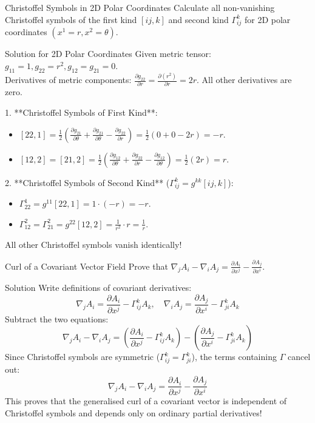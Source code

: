 \documentclass[11pt,a4paper]{article}
\begin{document}
\begin{examplebox}{Christoffel Symbols in 2D Polar Coordinates}
Calculate all non-vanishing Christoffel symbols of the first kind $[ij, k]$ and second kind $\Gamma^k_{ij}$ for 2D polar coordinates $(x^1=r, x^2=\theta)$.
\end{examplebox}
\begin{proofbox}{Solution for 2D Polar Coordinates}
Given metric tensor: $g_{11} = 1, g_{22} = r^2, g_{12} = g_{21} = 0$. \\
Derivatives of metric components: $\frac{\partial g_{22}}{\partial r} = \frac{\partial(r^2)}{\partial r} = 2r$. All other derivatives are zero.

1. **Christoffel Symbols of First Kind**:
\begin{itemize}
    \item $[22, 1] = \frac{1}{2} \left( \frac{\partial g_{21}}{\partial \theta} + \frac{\partial g_{21}}{\partial \theta} - \frac{\partial g_{22}}{\partial r} \right) = \frac{1}{2} (0 + 0 - 2r) = -r$.
    \item $[12, 2] = [21, 2] = \frac{1}{2} \left( \frac{\partial g_{12}}{\partial \theta} + \frac{\partial g_{22}}{\partial r} - \frac{\partial g_{12}}{\partial \theta} \right) = \frac{1}{2} (2r) = r$.
\end{itemize}

2. **Christoffel Symbols of Second Kind** ($\Gamma^k_{ij} = g^{kk} [ij, k]$):
\begin{itemize}
    \item $\Gamma^1_{22} = g^{11} [22, 1] = 1 \cdot (-r) = -r$.
    \item $\Gamma^2_{12} = \Gamma^2_{21} = g^{22} [12, 2] = \frac{1}{r^2} \cdot r = \frac{1}{r}$.
\end{itemize}
All other Christoffel symbols vanish identically!
\end{proofbox}

\begin{examplebox}{Curl of a Covariant Vector Field}
Prove that $\nabla_j A_i - \nabla_i A_j = \frac{\partial A_i}{\partial x^j} - \frac{\partial A_j}{\partial x^i}$.
\end{examplebox}
\begin{proofbox}{Solution}
Write definitions of covariant derivatives:
\[
\nabla_j A_i = \frac{\partial A_i}{\partial x^j} - \Gamma^k_{ij} A_k, \quad \nabla_i A_j = \frac{\partial A_j}{\partial x^i} - \Gamma^k_{ji} A_k
\]
Subtract the two equations:
\[
\nabla_j A_i - \nabla_i A_j = \left( \frac{\partial A_i}{\partial x^j} - \Gamma^k_{ij} A_k \right) - \left( \frac{\partial A_j}{\partial x^i} - \Gamma^k_{ji} A_k \right)
\]
Since Christoffel symbols are symmetric ($\Gamma^k_{ij} = \Gamma^k_{ji}$), the terms containing $\Gamma$ cancel out:
\[
\nabla_j A_i - \nabla_i A_j = \frac{\partial A_i}{\partial x^j} - \frac{\partial A_j}{\partial x^i}
\]
This proves that the generalised curl of a covariant vector is independent of Christoffel symbols and depends only on ordinary partial derivatives!
\end{proofbox}
\end{document}
